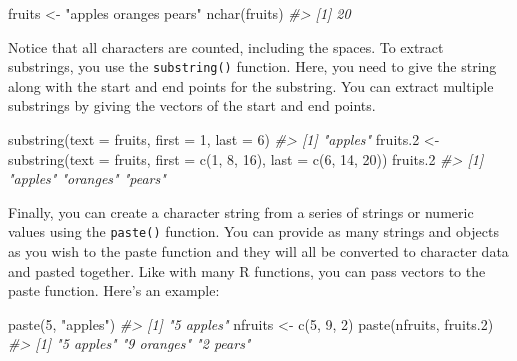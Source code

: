\documentclass[
]{book}
\newenvironment{Shaded}{\begin{snugshade}}{\end{snugshade}}
\newcommand{\AttributeTok}[1]{\textcolor[rgb]{0.77,0.63,0.00}{#1}}
\newcommand{\CommentTok}[1]{\textcolor[rgb]{0.56,0.35,0.01}{\textit{#1}}}
\newcommand{\DecValTok}[1]{\textcolor[rgb]{0.00,0.00,0.81}{#1}}
\newcommand{\FloatTok}[1]{\textcolor[rgb]{0.00,0.00,0.81}{#1}}
\newcommand{\FunctionTok}[1]{\textcolor[rgb]{0.00,0.00,0.00}{#1}}
\newcommand{\NormalTok}[1]{#1}
\newcommand{\OtherTok}[1]{\textcolor[rgb]{0.56,0.35,0.01}{#1}}
\newcommand{\StringTok}[1]{\textcolor[rgb]{0.31,0.60,0.02}{#1}}
\begin{document}
\begin{Shaded}
\begin{Highlighting}[]
\NormalTok{fruits }\OtherTok{\textless{}{-}} \StringTok{"apples oranges pears"}
\FunctionTok{nchar}\NormalTok{(fruits)}
\CommentTok{\#\textgreater{} [1] 20}
\end{Highlighting}
\end{Shaded}

Notice that all characters are counted, including the spaces. To extract substrings, you use the \texttt{substring()} function. Here, you need to give the string along with the start and end points for the substring. You can extract multiple substrings by giving the vectors of the start and end points.

\begin{Shaded}
\begin{Highlighting}[]
\FunctionTok{substring}\NormalTok{(}\AttributeTok{text =}\NormalTok{ fruits, }\AttributeTok{first =} \DecValTok{1}\NormalTok{, }\AttributeTok{last =} \DecValTok{6}\NormalTok{)}
\CommentTok{\#\textgreater{} [1] "apples"}
\NormalTok{fruits}\FloatTok{.2} \OtherTok{\textless{}{-}} \FunctionTok{substring}\NormalTok{(}\AttributeTok{text =}\NormalTok{ fruits, }\AttributeTok{first =} \FunctionTok{c}\NormalTok{(}\DecValTok{1}\NormalTok{, }\DecValTok{8}\NormalTok{, }\DecValTok{16}\NormalTok{), }\AttributeTok{last =} \FunctionTok{c}\NormalTok{(}\DecValTok{6}\NormalTok{, }\DecValTok{14}\NormalTok{, }\DecValTok{20}\NormalTok{))}
\NormalTok{fruits}\FloatTok{.2}
\CommentTok{\#\textgreater{} [1] "apples"  "oranges" "pears"}
\end{Highlighting}
\end{Shaded}

Finally, you can create a character string from a series of strings or numeric values using the \texttt{paste()} function. You can provide as many strings and objects as you wish to the paste function and they will all be converted to character data and pasted together. Like with many R functions, you can pass vectors to the paste function. Here's an example:

\begin{Shaded}
\begin{Highlighting}[]
\FunctionTok{paste}\NormalTok{(}\DecValTok{5}\NormalTok{, }\StringTok{"apples"}\NormalTok{)}
\CommentTok{\#\textgreater{} [1] "5 apples"}
\NormalTok{nfruits }\OtherTok{\textless{}{-}} \FunctionTok{c}\NormalTok{(}\DecValTok{5}\NormalTok{, }\DecValTok{9}\NormalTok{, }\DecValTok{2}\NormalTok{)}
\FunctionTok{paste}\NormalTok{(nfruits, fruits}\FloatTok{.2}\NormalTok{)}
\CommentTok{\#\textgreater{} [1] "5 apples"  "9 oranges" "2 pears"}
\end{Highlighting}
\end{Shaded}
\end{document}
